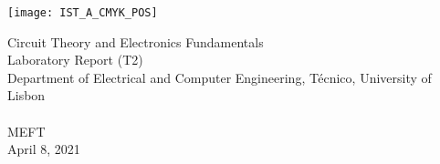 
\thispagestyle {empty}

\texttt{[image: IST\_A\_CMYK\_POS]}

\begin{center}
%
\vspace{1.0cm}

\vspace{1cm}
{\FontLb Circuit Theory and Electronics Fundamentals} \\ %
\vspace{1cm}
{\FontLb Laboratory Report (T2)} \\
\vspace{1cm}
{\FontSn Department of Electrical and Computer Engineering, Técnico, University of Lisbon} \\ %
\vspace{0.5cm}
{ } \\
\vspace{0.5cm}
{\FontSn MEFT } \\
\vspace{0.5cm}
{\FontSn April 8, 2021} \\ %
%
\end{center}

